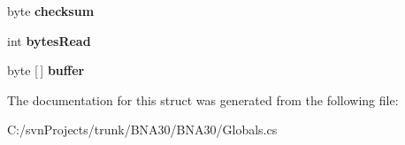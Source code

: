 \begin{DoxyCompactItemize}
\item 
\mbox{\label{struct_b_n_a30_1_1_globals2_1_1_cal_amp_diag_struct_a9ac1423358f3807123642a0fe33b61ab}} 
byte {\bfseries checksum}
\item 
\mbox{\label{struct_b_n_a30_1_1_globals2_1_1_cal_amp_diag_struct_a9ca6f8242a3471c2f22d685d83f07190}} 
int {\bfseries bytes\+Read}
\item 
\mbox{\label{struct_b_n_a30_1_1_globals2_1_1_cal_amp_diag_struct_ae59317d87edc2c9ad5707152f3f2546b}} 
byte \mbox{[}$\,$\mbox{]} {\bfseries buffer}
\end{DoxyCompactItemize}


The documentation for this struct was generated from the following file\+:\begin{DoxyCompactItemize}
\item 
C\+:/svn\+Projects/trunk/\+B\+N\+A30/\+B\+N\+A30/Globals.\+cs\end{DoxyCompactItemize}
